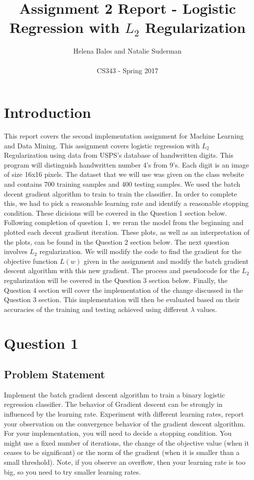 \documentclass[letterpaper,10pt]{article}
\title{Assignment 2 Report - Logistic Regression with \(L_2\) Regularization}
\author{Helena Bales and Natalie Suderman\\ \\ CS343 - Spring 2017}
\begin{document}
\maketitle

\tableofcontents
\clearpage

\section{Introduction}
This report covers the second implementation assignment for Machine Learning and Data Mining. This 
assignment covers logistic regression with \(L_2\) Regularization using data from USPS's database of 
handwritten digits. This program will distinguish handwritten number 4's from 9's. Each digit is an 
image of size 16x16 pixels. The dataset that we will use was given on the class website and contains 
700 training samples and 400 testing samples. We used the batch decent gradient algorithm to train 
to train the classifier. In order to complete this, we had to pick a reasonable learning rate and 
identify a reasonable stopping condition. These dicisions will be covered in the Question 1 section 
below. Following completion of question 1, we reran the model from the beginning and plotted each 
decent gradient iteration. These plots, as well as an interpretation of the plots, can be found in 
the Question 2 section below. The next question involves \(L_2\) regularization. We will modify the 
code to find the gradient for the objective function \(L(w)\) given in the assignment and modify the 
batch gradient descent algorithm with this new gradient. The process and pseudocode for the \(L_2\) 
regularization will be covered in the Question 3 section below. Finally, the Question 4 section will 
cover the implementation of the change discussed in the Question 3 section. This implementation will 
then be evaluated based on their accuracies of the training and testing achieved using different 
\(\lambda\) values.

\section{Question 1}
\subsection{Problem Statement}
Implement the batch gradient descent algorithm to train a binary logistic regression classifier. 
The behavior of Gradient descent can be strongly in influenced by the learning rate. Experiment with 
different learning rates, report your observation on the convergence behavior of the gradient 
descent algorithm. For your implementation, you will need to decide a stopping condition. You might 
use a fixed number of iterations, the change of the objective value (when it ceases to be 
significant) or the norm of the gradient (when it is smaller than a small threshold). Note, if you 
observe an overflow, then your learning rate is too big, so you need to try smaller learning rates.
\end{document}
